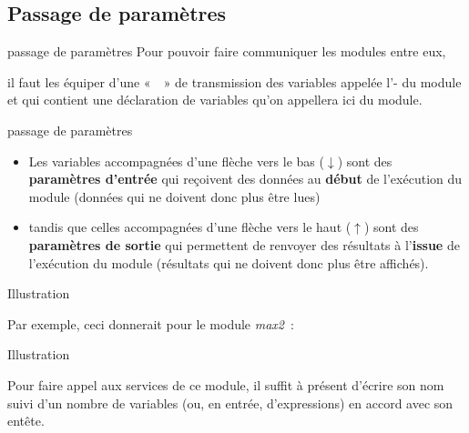 \subsection{Passage de paramètres}

\begin{frame}{passage de paramètres}
	Pour pouvoir faire communiquer les modules entre eux, 
	
	il faut les	équiper d’une «~~» 
	de transmission des variables appelée
	l’- du module et qui contient une déclaration de
	variables qu’on appellera ici  du module. 
\end{frame}

\begin{frame}{passage de paramètres}
	\begin{itemize}
	\item
	Les variables accompagnées d’une flèche vers le bas ($\downarrow$) sont
	des \textbf{paramètres d’entrée} qui reçoivent des données au
	\textbf{début} de l’exécution du module (données qui ne doivent donc
	plus être lues) 
	\item
	tandis que celles accompagnées d’une flèche vers le
	haut ($\uparrow$) sont des \textbf{paramètres de sortie} qui permettent
	de renvoyer des résultats à l’\textbf{issue} de l’exécution du module
	(résultats qui ne doivent donc plus être affichés). 
	\end{itemize}
\end{frame}

\begin{frame}{Illustration}

	Par exemple, ceci donnerait pour le module \textit{max2}~:

	\bigskip
	
\end{frame}

\begin{frame}{Illustration}

	Pour faire appel aux services de ce module, il
	suffit à présent d’écrire son nom suivi d’un nombre de variables (ou,
	en entrée, d'expressions) en accord avec son entête. 
\end{frame}

